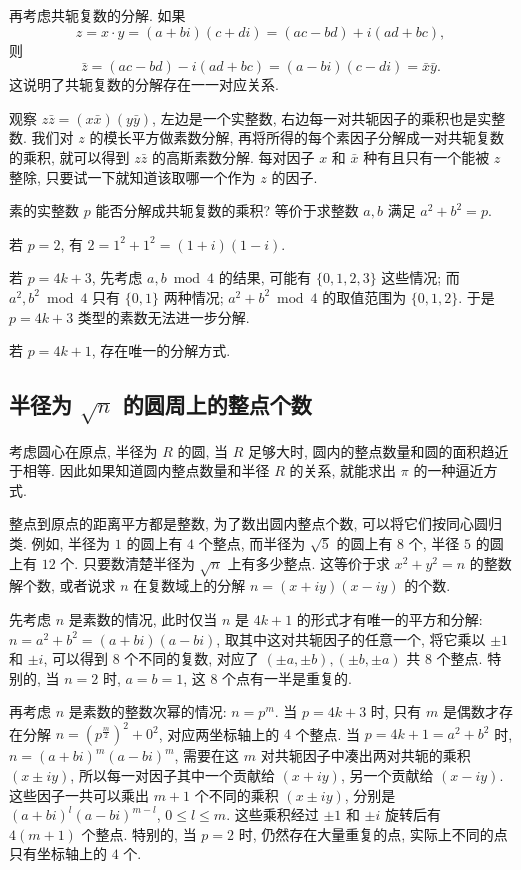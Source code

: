 再考虑共轭复数的分解. 如果 
$$ z = x\cdot y = (a+bi)(c+di) = (ac-bd)+i(ad+bc), $$ 则 $$ \bar{z} = (ac-bd)-i(ad+bc) = (a-bi)(c-di) = \bar{x}\bar{y}. $$ 这说明了共轭复数的分解存在一一对应关系.

观察 $ z\bar{z}= (x\bar{x})(y\bar{y}) $, 左边是一个实整数, 右边每一对共轭因子的乘积也是实整数. 我们对 $ z $ 的模长平方做素数分解, 再将所得的每个素因子分解成一对共轭复数的乘积, 就可以得到 $ z\bar{z} $ 的高斯素数分解. 每对因子 $ x $ 和 $ \bar{x} $ 种有且只有一个能被 $ z $ 整除, 只要试一下就知道该取哪一个作为 $ z $ 的因子.

素的实整数 $ p $ 能否分解成共轭复数的乘积? 等价于求整数 $ a, b $ 满足 $ a^2 + b^2 = p $.

若 $ p = 2 $, 有 $ 2 = 1^2 + 1^2 = (1+i)(1-i) $.

若 $ p = 4k + 3 $, 先考虑 $ a, b \bmod{4} $ 的结果, 可能有 $\{0, 1, 2, 3\} $ 这些情况; 而 $ a^2, b^2 \bmod{4} $ 只有 $ \{0, 1\} $ 两种情况; $ a^2 + b^2 \bmod{4} $ 的取值范围为 $ \{0,1,2\} $. 于是 $ p = 4k + 3 $ 类型的素数无法进一步分解.

若 $ p = 4k + 1$, 存在唯一的分解方式.

\subsection{半径为 $ \sqrt{n} $ 的圆周上的整点个数}

考虑圆心在原点, 半径为 $ R $ 的圆, 当 $ R $ 足够大时, 圆内的整点数量和圆的面积趋近于相等. 因此如果知道圆内整点数量和半径 $ R $ 的关系, 就能求出 $ \pi $ 的一种逼近方式.

整点到原点的距离平方都是整数, 为了数出圆内整点个数, 可以将它们按同心圆归类. 例如, 半径为 $ 1 $ 的圆上有 $ 4 $ 个整点, 而半径为 $ \sqrt{5} $ 的圆上有 $ 8 $ 个, 半径 $ 5 $ 的圆上有 $ 12 $ 个. 只要数清楚半径为 $ \sqrt{n} $ 上有多少整点. 这等价于求 $ x^2+y^2 = n $ 的整数解个数, 或者说求 $ n $ 在复数域上的分解 $ n = (x+iy)(x-iy) $ 的个数.

先考虑 $ n $ 是素数的情况, 此时仅当 $ n $ 是 $ 4k + 1 $ 的形式才有唯一的平方和分解: $ n = a^2 + b^2 = (a+bi)(a-bi) $, 取其中这对共轭因子的任意一个, 将它乘以 $ \pm 1 $ 和 $ \pm i $, 可以得到 8 个不同的复数, 对应了 $ (\pm a, \pm b), (\pm b, \pm a) $ 共 $8$ 个整点. 特别的, 当 $ n = 2 $ 时, $ a = b = 1 $, 这 $8$ 个点有一半是重复的.

再考虑 $ n $ 是素数的整数次幂的情况: $ n = p^m $. 当 $ p = 4k + 3 $ 时, 只有 $ m $ 是偶数才存在分解 $ n = (p^\frac{m}{2})^2 + 0^2 $, 对应两坐标轴上的 $4$ 个整点. 当 $ p = 4k + 1 = a^2+b^2 $ 时, $ n = (a+bi)^m(a-bi)^m $, 需要在这 $ m $ 对共轭因子中凑出两对共轭的乘积 $ (x\pm iy) $, 所以每一对因子其中一个贡献给 $(x+iy)$, 另一个贡献给 $(x-iy)$. 这些因子一共可以乘出 $m+1$ 个不同的乘积 $ (x\pm iy) $, 分别是 $(a+bi)^l(a-bi)^{m-l} $, $ 0 \le l \le m $. 这些乘积经过 $ \pm 1 $ 和 $ \pm i $ 旋转后有 $ 4(m+1) $ 个整点. 特别的, 当 $ p = 2 $ 时, 仍然存在大量重复的点, 实际上不同的点只有坐标轴上的 $4$ 个.

